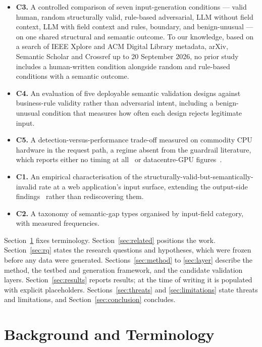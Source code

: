 \documentclass[conference]{IEEEtran}
\begin{document}
\begin{itemize}
  \item \textbf{C3.} A controlled comparison of seven input-generation conditions --- valid human,
  random structurally valid, rule-based adversarial, LLM without field context, LLM with field
  context and rules, boundary, and benign-unusual --- on one shared structural and semantic outcome.
  To our knowledge, based on a search of IEEE Xplore and ACM Digital Library metadata, arXiv,
  Semantic Scholar and Crossref up to 20 September 2026, no prior study includes a human-written
  condition alongside random and rule-based conditions with a semantic outcome.
  \item \textbf{C4.} An evaluation of five deployable semantic validation designs against business-rule
  validity rather than adversarial intent, including a benign-unusual condition that measures how
  often each design rejects legitimate input.
  \item \textbf{C5.} A detection-versus-performance trade-off measured on commodity CPU hardware in
  the request path, a regime absent from the guardrail literature, which reports either no timing at
  all~\cite{jacob2025promptshield} or datacentre-GPU figures~\cite{ahmed2026reflexguard,saleem2026layered,wang2026sokguardrails}.
  \item \textbf{C1.} An empirical characterisation of the structurally-valid-but-semantically-invalid
  rate at a web application's input surface, extending the output-side
  findings~\cite{li2026orderbench,ray2026constrainttax,singh2026sob,wrenn2026enterprise} rather than
  rediscovering them.
  \item \textbf{C2.} A taxonomy of semantic-gap types organised by input-field category, with
  measured frequencies.
\end{itemize}

Section~\ref{sec:background} fixes terminology. Section~\ref{sec:related} positions the work.
Section~\ref{sec:rq} states the research questions and hypotheses, which were frozen before any data
were generated. Sections~\ref{sec:method} to \ref{sec:layer} describe the method, the testbed and
generation framework, and the candidate validation layers. Section~\ref{sec:results} reports results;
at the time of writing it is populated with explicit placeholders. Sections~\ref{sec:threats} and
\ref{sec:limitations} state threats and limitations, and Section~\ref{sec:conclusion} concludes.

\section{Background and Terminology}
\label{sec:background}
\end{document}
